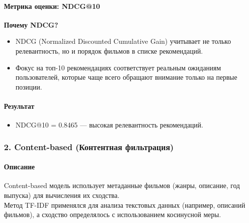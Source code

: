 \hypertarget{ux43cux435ux442ux440ux438ux43aux430-ux43eux446ux435ux43dux43aux438-ndcg10}{%
\paragraph{Метрика оценки:
NDCG@10}\label{ux43cux435ux442ux440ux438ux43aux430-ux43eux446ux435ux43dux43aux438-ndcg10}} 

\leavevmode

  \textbf{Почему NDCG?}

  \begin{itemize}
  \tightlist
  \item
    NDCG (Normalized Discounted Cumulative Gain) учитывает не только
    релевантность, но и порядок фильмов в списке рекомендаций.
  \item
    Фокус на топ-10 рекомендациях соответствует реальным ожиданиям
    пользователей, которые чаще всего обращают внимание только на первые
    позиции.
  \end{itemize}


\hypertarget{ux440ux435ux437ux443ux43bux44cux442ux430ux442}{%
\paragraph{Результат}\label{ux440ux435ux437ux443ux43bux44cux442ux430ux442}}

\begin{itemize}
\tightlist
\item
  NDCG@10 = 0.8465 --- высокая релевантность рекомендаций.
\end{itemize}

\hypertarget{content-based-ux43aux43eux43dux442ux435ux43dux442ux43dux430ux44f-ux444ux438ux43bux44cux442ux440ux430ux446ux438ux44f}{%
\subsubsection*{2. Content-based (Контентная
фильтрация)}\label{content-based-ux43aux43eux43dux442ux435ux43dux442ux43dux430ux44f-ux444ux438ux43bux44cux442ux440ux430ux446ux438ux44f}}

\hypertarget{ux43eux43fux438ux441ux430ux43dux438ux435-2}{%
\paragraph{Описание}\label{ux43eux43fux438ux441ux430ux43dux438ux435-2}}

\leavevmode

Content-based модель использует метаданные фильмов (жанры, описание, год
выпуска) для вычисления их сходства.\\
Метод TF-IDF применялся для анализа текстовых данных (например, описаний
фильмов), а сходство определялось с использованием косинусной меры.

